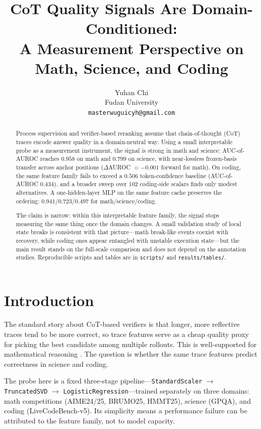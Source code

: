\documentclass[10pt,twocolumn]{article}
\title{\textbf{CoT Quality Signals Are Domain-Conditioned:\\[2pt]
\large A Measurement Perspective on Math, Science, and Coding}}
\author{Yuhan Chi\\Fudan University\\\texttt{masterwuguicyh@gmail.com}}
\date{}
\begin{document}
\maketitle

\begin{abstract}
Process supervision and verifier-based reranking assume that chain-of-thought (CoT) traces encode answer quality in a domain-neutral way. Using a small interpretable probe as a measurement instrument, the signal is strong in math and science: AUC-of-AUROC reaches $0.958$ on math and $0.799$ on science, with near-lossless frozen-basis transfer across anchor positions ($\Delta$AUROC $= -0.001$ forward for math). On coding, the same feature family fails to exceed a $0.506$ token-confidence baseline (AUC-of-AUROC $0.434$), and a broader sweep over 102 coding-side scalars finds only modest alternatives. A one-hidden-layer MLP on the same feature cache preserves the ordering: $0.941 / 0.723 / 0.497$ for math/science/coding.

The claim is narrow: within this interpretable feature family, the signal stops measuring the same thing once the domain changes. A small validation study of local state breaks is consistent with that picture---math break-like events coexist with recovery, while coding ones appear entangled with unstable execution state---but the main result stands on the full-scale comparison and does not depend on the annotation studies. Reproducible scripts and tables are in \texttt{scripts/} and \texttt{results/tables/}.
\end{abstract}

\section{Introduction}

The standard story about CoT-based verifiers is that longer, more reflective traces tend to be more correct, so trace features serve as a cheap quality proxy for picking the best candidate among multiple rollouts. This is well-supported for mathematical reasoning \citep{cobbe2021training,lightman2023verify,wang2024mathshepherd}. The question is whether the same trace features predict correctness in science and coding.

The probe here is a fixed three-stage pipeline---\texttt{StandardScaler} $\to$ \texttt{TruncatedSVD} $\to$ \texttt{LogisticRegression}---trained separately on three domains: math competitions (AIME24/25, BRUMO25, HMMT25), science (GPQA), and coding (LiveCodeBench-v5). Its simplicity means a performance failure can be attributed to the feature family, not to model capacity.
\end{document}

